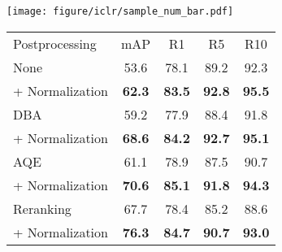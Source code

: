 \begin{table}[t]
\begin{minipage}[c]{0.48\linewidth}
    \centering
    \texttt{[image: figure/iclr/sample\_num\_bar.pdf]}
    \vspace{-5px}
    \label{fig:sample_num}
\end{minipage}\hfill
\begin{minipage}[c]{0.48\linewidth}
\centering
    {
    \scriptsize
    \renewcommand{\arraystretch}{1.1}
    \label{tab:combination}
    \setlength{\tabcolsep}{0.7em}
    \begin{tabular}{l|cccc}
        \hline
        \multirow{2}{*}{Postprocessing} &
        \multirow{2}{*}{mAP} &
        \multirow{2}{*}{R1} &
        \multirow{2}{*}{R5} &
        \multirow{2}{*}{R10} \\
        
        \multicolumn{1}{c|}{} & 
        \multicolumn{1}{c}{} & 
        \multicolumn{1}{c}{} & 
        \multicolumn{1}{c}{} & 
        \multicolumn{1}{c}{} \\
        \hline \hline
        
        None & 53.6 & 78.1 & 89.2 & 92.3 \\
        + Normalization & \textbf{62.3} & \textbf{83.5} & \textbf{92.8} & \textbf{95.5} \\
        \hline
        DBA~\citep{gordo2017dba} & 59.2 & 77.9 & 88.4 & 91.8 \\
        + Normalization & \textbf{68.6} & \textbf{84.2} & \textbf{92.7} & \textbf{95.1} \\
        \hline
        AQE~\citep{chum2007aqe} & 61.1 & 78.9 & 87.5 & 90.7 \\
        + Normalization & \textbf{70.6} & \textbf{85.1} & \textbf{91.8} & \textbf{94.3} \\
        \hline
        Reranking~\citep{zhong2017reranking} & 67.7 & 78.4 & 85.2 & 88.6 \\
        + Normalization & \textbf{76.3} & \textbf{84.7} & \textbf{90.7} & \textbf{93.0} \\
        \hline
    \end{tabular}
    }
    \vspace{4pt}
  \end{minipage}
\end{table}

